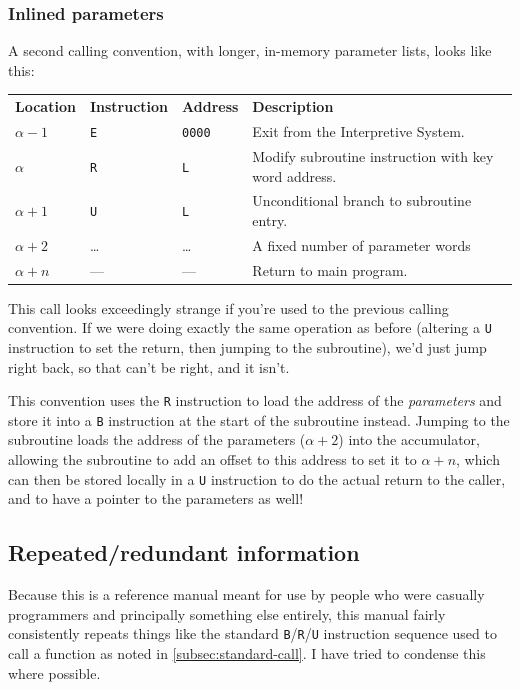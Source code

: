 \documentclass{article}
\begin{document}
\subsubsection*{Inlined parameters}
\label{subsec:standard-call2}
A second calling convention, with longer, in-memory parameter lists, looks like this:
\begin{center}
\begin{tabular}{llll}
\textbf{Location} & \textbf{Instruction} & \textbf{Address} & \textbf{Description} \\
$\alpha - 1$      & \texttt{E}            & \texttt{0000}    & Exit from the Interpretive System. \\
$\alpha$          & \texttt{R}            & \texttt{L}       & Modify subroutine instruction with key word address. \\
$\alpha + 1$      & \texttt{U}            & \texttt{L}       & Unconditional branch to subroutine entry. \\
$\alpha + 2$      & \dots                 & \dots            & A fixed number of parameter words \\
$\alpha + n$      & ---                   & ---              & Return to main program. \\
\end{tabular}
\end{center}
\noindent
This call looks exceedingly strange if you're used to the previous calling convention. If we were doing exactly the same operation as before (altering a \texttt{U} instruction to set the return, then jumping to the subroutine), we'd just jump right back, so that can't be right, and it isn't.

This convention uses the \texttt{R} instruction to load the address of the \emph{parameters} and store it into a \texttt{B} instruction at the start of the subroutine instead. Jumping to the subroutine loads the address of the parameters ($\alpha+2$) into the accumulator, allowing the subroutine to add an offset to this address to set it to $\alpha+n$, which can then be stored locally in a \texttt{U} instruction to do the actual return to the caller, and to have a pointer to the parameters as well!

\subsection{Repeated/redundant information}

Because this is a reference manual meant for use by people who were casually programmers and principally something else entirely, this manual fairly consistently repeats things like the standard \texttt{B}/\texttt{R}/\texttt{U} instruction sequence used to call a function as noted in \ref{subsec:standard-call}. I have tried to condense this where possible.
\end{document}

